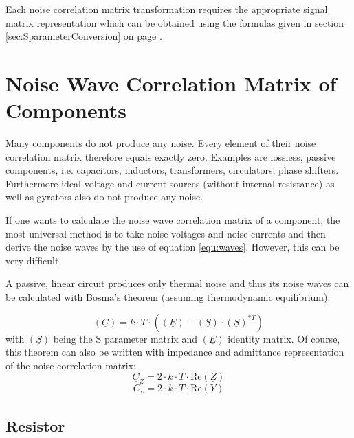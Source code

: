 \documentclass[10pt]{report}
\begin{document}
\addvspace{12pt}

Each noise correlation matrix transformation requires the appropriate
signal matrix representation which can be obtained using the formulas
given in section \ref{sec:SparameterConversion} on page
\pageref{sec:SparameterConversion}.

\section{Noise Wave Correlation Matrix of Components}

Many components do not produce any noise.  Every element of their
noise correlation matrix therefore equals exactly zero.  Examples are
lossless, passive components, i.e. capacitors, inductors,
transformers, circulators, phase shifters.  Furthermore ideal voltage
and current sources (without internal resistance) as well as gyrators
also do not produce any noise.

\addvspace{12pt}

If one wants to calculate the noise wave correlation matrix of a
component, the most universal method is to take noise voltages and
noise currents and then derive the noise waves by the use of equation
\eqref{equ:waves}.  However, this can be very difficult.

\addvspace{12pt}

A passive, linear circuit produces only thermal noise and thus its
noise waves can be calculated with Bosma's theorem (assuming
thermodynamic equilibrium).

\begin{equation}
(\underline{C}) = k\cdot T\cdot \left( (\underline{E}) - (\underline{S})\cdot(\underline{S})^{*T} \right)
\end{equation}
with $(\underline{S})$ being the S parameter matrix and $(\underline{E})$ identity matrix.
Of course, this theorem can also be written with impedance and admittance representation
of the noise correlation matrix:
\begin{equation}
\underline{C}_Z = 2\cdot k\cdot T\cdot \text{Re}(\underline{Z})
\end{equation}
\begin{equation}
\underline{C}_Y = 2\cdot k\cdot T\cdot \text{Re}(\underline{Y})
\end{equation}


\subsection{Resistor}
\end{document}
